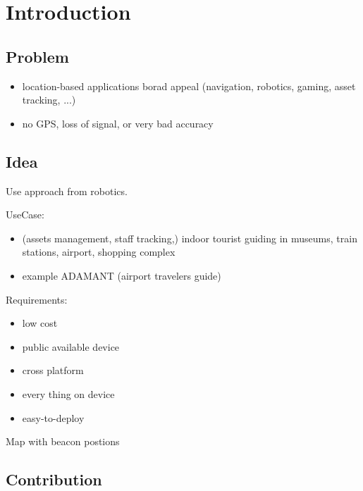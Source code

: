 \chapter{Introduction} \label{chap:intro}

\section{Problem}
\begin{itemize}
\item location-based applications borad appeal (navigation, robotics, gaming, asset tracking, ...)
\item no GPS, loss of signal, or very bad accuracy
\end{itemize}

\section{Idea}

Use approach from robotics.

UseCase:
\begin{itemize}
  \item (assets management, staff tracking,) indoor tourist guiding in museums, train stations, airport, shopping complex \cite{wang_2013}
  \item example ADAMANT (airport travelers guide) \cite{wang_2013}
\end{itemize}

Requirements:
\begin{itemize}
\item low cost
\item public available device
\item cross platform
\item every thing on device \cite{wang_2013}
\item easy-to-deploy \cite{wang_2013}
\end{itemize}

Map with beacon postions

\section{Contribution}


